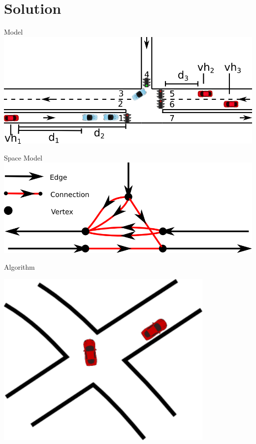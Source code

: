 
\section{Solution}
\begin{frame}{Model}
\includegraphics[width=1\textwidth]{images/introNetwork.png}
\end{frame}

\begin{frame}{Space Model}
\includegraphics[width=1\textwidth]{images/ConnectionNetwork.png}
\end{frame}

\begin{frame}{Algorithm}
\begin{center}
\includegraphics[width=0.8\textwidth]{images/algjuction.png}
\end{center}
\end{frame}

